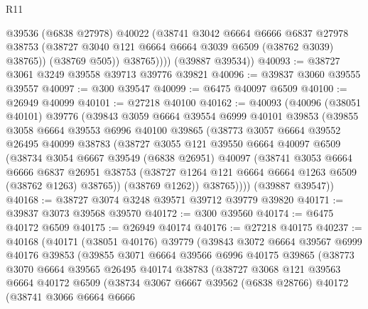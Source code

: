 \begin{lexlean}{R11}
\begin{coremodule}
                @39536
                (@6838 @27978)
                @40022
                (@38741
                  @3042
                  @6664
                  @6666
                  @6837
                  @27978
                  @38753
                  (@38727 @3040 @121 @6664 @6664 @3039 @6509 (@38762 @3039) @38765))
                (@38769 @505))
              @38765))))
      (@39887 @39534))
@40093 := @38727 @3061 @3249 @39558 @39713 @39776 @39821
@40096 := @39837 @3060 @39555 @39557
@40097 := @300 @39547
@40099 := @6475 @40097 @6509
@40100 := @26949 @40099
@40101 := @27218 @40100
@40162 := @40093
    (@40096
      (@38051 @40101)
      @39776
      (@39843
        @3059
        @6664
        @39554
        @6999
        @40101
        @39853
        (@39855
          @3058
          @6664
          @39553
          @6996
          @40100
          @39865
          (@38773
            @3057
            @6664
            @39552
            @26495
            @40099
            @38783
            (@38727
              @3055
              @121
              @39550
              @6664
              @40097
              @6509
              (@38734
                @3054
                @6667
                @39549
                (@6838 @26951)
                @40097
                (@38741
                  @3053
                  @6664
                  @6666
                  @6837
                  @26951
                  @38753
                  (@38727 @1264 @121 @6664 @6664 @1263 @6509 (@38762 @1263) @38765))
                (@38769 @1262))
              @38765))))
      (@39887 @39547))
@40168 := @38727 @3074 @3248 @39571 @39712 @39779 @39820
@40171 := @39837 @3073 @39568 @39570
@40172 := @300 @39560
@40174 := @6475 @40172 @6509
@40175 := @26949 @40174
@40176 := @27218 @40175
@40237 := @40168
    (@40171
      (@38051 @40176)
      @39779
      (@39843
        @3072
        @6664
        @39567
        @6999
        @40176
        @39853
        (@39855
          @3071
          @6664
          @39566
          @6996
          @40175
          @39865
          (@38773
            @3070
            @6664
            @39565
            @26495
            @40174
            @38783
            (@38727
              @3068
              @121
              @39563
              @6664
              @40172
              @6509
              (@38734
                @3067
                @6667
                @39562
                (@6838 @28766)
                @40172
                (@38741
                  @3066
                  @6664
                  @6666

\end{coremodule}
\end{lexlean}
